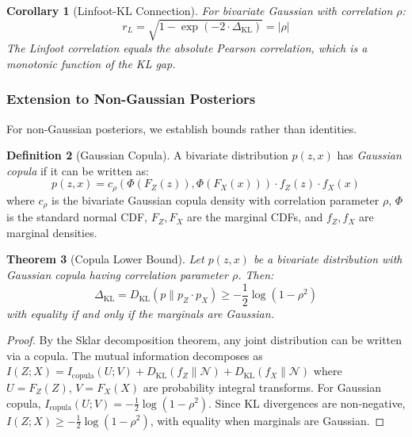 \documentclass[10pt]{article} %
\theoremstyle{plain}
\newtheorem{theorem}{Theorem}[section]
\newtheorem{corollary}[theorem]{Corollary}
\theoremstyle{definition}
\newtheorem{definition}[theorem]{Definition}
\begin{document}
\begin{corollary}[Linfoot-KL Connection]
\label{cor:linfoot-kl}
For bivariate Gaussian with correlation $\rho$:
\begin{equation}
r_L = \sqrt{1 - \exp(-2 \cdot \Delta_{\text{KL}})} = |\rho|
\end{equation}
The Linfoot correlation equals the absolute Pearson correlation, which is a monotonic function of the KL gap.
\end{corollary}

\subsubsection{Extension to Non-Gaussian Posteriors}

For non-Gaussian posteriors, we establish bounds rather than identities.

\begin{definition}[Gaussian Copula]
A bivariate distribution $p(z, x)$ has \emph{Gaussian copula} if it can be written as:
\begin{equation}
p(z, x) = c_\rho(\Phi(F_Z(z)), \Phi(F_X(x))) \cdot f_Z(z) \cdot f_X(x)
\end{equation}
where $c_\rho$ is the bivariate Gaussian copula density with correlation parameter $\rho$, $\Phi$ is the standard normal CDF, $F_Z, F_X$ are the marginal CDFs, and $f_Z, f_X$ are marginal densities.
\end{definition}

\begin{theorem}[Copula Lower Bound]
\label{thm:copula-bound}
Let $p(z, x)$ be a bivariate distribution with Gaussian copula having correlation parameter $\rho$. Then:
\begin{equation}
\Delta_{\text{KL}} = D_{\text{KL}}(p \| p_Z \cdot p_X) \geq -\frac{1}{2}\log(1 - \rho^2)
\end{equation}
with equality if and only if the marginals are Gaussian.
\end{theorem}

\begin{proof}
By the Sklar decomposition theorem, any joint distribution can be written via a copula. The mutual information decomposes as $I(Z; X) = I_{\text{copula}}(U; V) + D_{\text{KL}}(f_Z \| \mathcal{N}) + D_{\text{KL}}(f_X \| \mathcal{N})$ where $U = F_Z(Z)$, $V = F_X(X)$ are probability integral transforms. For Gaussian copula, $I_{\text{copula}}(U; V) = -\frac{1}{2}\log(1-\rho^2)$. Since KL divergences are non-negative, $I(Z; X) \geq -\frac{1}{2}\log(1-\rho^2)$, with equality when marginals are Gaussian.
\end{proof}
\end{document}
